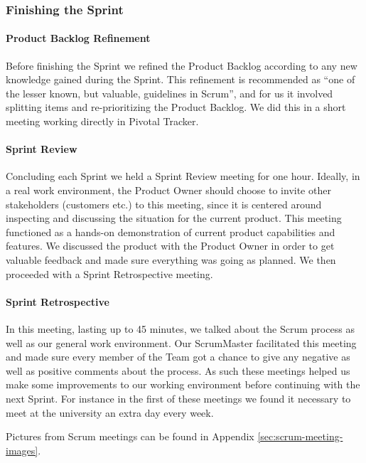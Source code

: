 \subsubsection{Finishing the Sprint}

\paragraph{Product Backlog Refinement}
Before finishing the Sprint we refined the Product Backlog according to any new knowledge gained during the Sprint. This refinement is recommended as ``one of the lesser known, but valuable, guidelines in Scrum''\cite{ScrumPrimer2}, and for us it involved splitting items and re-prioritizing the Product Backlog. We did this in a short meeting working directly in Pivotal Tracker.

\paragraph{Sprint Review}
Concluding each Sprint we held a Sprint Review meeting for one hour. Ideally, in a real work environment, the Product Owner should choose to invite other stakeholders (customers etc.) to this meeting, since it is centered around inspecting and discussing the situation for the current product. This meeting functioned as a hands-on demonstration of current product capabilities and features. We discussed the product with the Product Owner in order to get valuable feedback and made sure everything was going as planned. We then proceeded with a Sprint Retrospective meeting.

\paragraph{Sprint Retrospective}
In this meeting, lasting up to 45 minutes, we talked about the Scrum process as well as our general work environment. Our ScrumMaster facilitated this meeting and made sure every member of the Team got a chance to give any negative as well as positive comments about the process. As such these meetings helped us make some improvements to our working environment before continuing with the next Sprint. For instance in the first of these meetings we found it necessary to meet at the university an extra day every week.

Pictures from Scrum meetings can be found in Appendix \ref{sec:scrum-meeting-images}.

